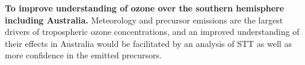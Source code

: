   \textbf{To improve understanding of ozone over the southern hemisphere including Australia.}
  Meteorology and precursor emissions are the largest drivers of tropospheric ozone concentrations, and an improved understanding of their effects in Australia would be facilitated by an analysis of STT as well as more confidence in the emitted precursors.
  
